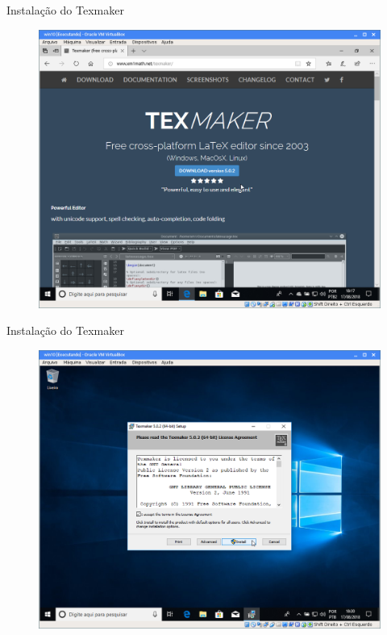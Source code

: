 \documentclass{beamer}
\begin{document}
\begin{frame}{Instala\c{c}\~ao do Texmaker}
    \begin{figure}[h]
        \includegraphics[scale=0.25]{fig/texmaker-site.png}
    \end{figure}
\end{frame}

\begin{frame}{Instala\c{c}\~ao do Texmaker}
    \begin{figure}[h]
        \includegraphics[scale=0.25]{fig/texmaker-01.png}
    \end{figure}
\end{frame}
\end{document}
